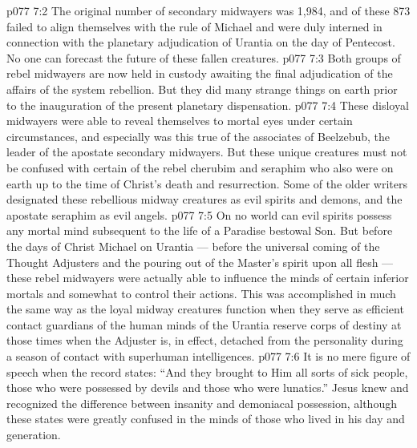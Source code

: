 \vs p077 7:2 The original number of secondary midwayers was 1,984, and of these 873 failed to align themselves with the rule of Michael and were duly interned in connection with the planetary adjudication of Urantia on the day of Pentecost. No one can forecast the future of these fallen creatures.
\vs p077 7:3 Both groups of rebel midwayers are now held in custody awaiting the final adjudication of the affairs of the system rebellion. But they did many strange things on earth prior to the inauguration of the present planetary dispensation.
\vs p077 7:4 These disloyal midwayers were able to reveal themselves to mortal eyes under certain circumstances, and especially was this true of the associates of Beelzebub, the leader of the apostate secondary midwayers. But these unique creatures must not be confused with certain of the rebel cherubim and seraphim who also were on earth up to the time of Christ’s death and resurrection. Some of the older writers designated these rebellious midway creatures as evil spirits and demons, and the apostate seraphim as evil angels.
\vs p077 7:5 On no world can evil spirits possess any mortal mind subsequent to the life of a Paradise bestowal Son. But before the days of Christ Michael on Urantia --- before the universal coming of the Thought Adjusters and the pouring out of the Master’s spirit upon all flesh --- these rebel midwayers were actually able to influence the minds of certain inferior mortals and somewhat to control their actions. This was accomplished in much the same way as the loyal midway creatures function when they serve as efficient contact guardians of the human minds of the Urantia reserve corps of destiny at those times when the Adjuster is, in effect, detached from the personality during a season of contact with superhuman intelligences.
\vs p077 7:6 It is no mere figure of speech when the record states: “And they brought to Him all sorts of sick people, those who were possessed by devils and those who were lunatics.” Jesus knew and recognized the difference between insanity and demoniacal possession, although these states were greatly confused in the minds of those who lived in his day and generation.
